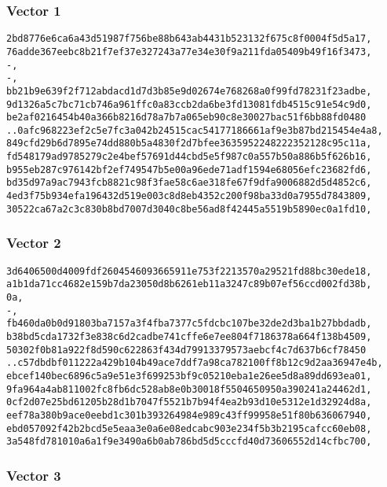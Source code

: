\documentclass[
]{article}
\begin{document}
\hypertarget{vector-1-1}{%
\subsubsection{Vector 1}\label{vector-1-1}}

\begin{verbatim}
2bd8776e6ca6a43d51987f756be88b643ab4431b523132f675c8f0004f5d5a17,
76adde367eebc8b21f7ef37e327243a77e34e30f9a211fda05409b49f16f3473,
-,
-,
bb21b9e639f2f712abdacd1d7d3b85e9d02674e768268a0f99fd78231f23adbe,
9d1326a5c7bc71cb746a961ffc0a83ccb2da6be3fd13081fdb4515c91e54c9d0,
be2af0216454b40a366b8216d78a7b7a065eb90c8e30027bac51f6bb88fd0480
..0afc968223ef2c5e7fc3a042b24515cac54177186661af9e3b87bd215454e4a8,
849cfd29b6d7895e74dd880b5a4830f2d7bfee3635952248222352128c95c11a,
fd548179ad9785279c2e4bef57691d44cbd5e5f987c0a557b50a886b5f626b16,
b955eb287c976142bf2ef749547b5e00a96ede71adf1594e68056efc23682fd6,
bd35d97a9ac7943fcb8821c98f3fae58c6ae318fe67f9dfa9006882d5d4852c6,
4ed3f75b934efa196432d519e003c8d8eb4352c200f98ba33d0a7955d7843809,
30522ca67a2c3c830b8bd7007d3040c8be56ad8f42445a5519b5890ec0a1fd10,
\end{verbatim}

\hypertarget{vector-2-1}{%
\subsubsection{Vector 2}\label{vector-2-1}}

\begin{verbatim}
3d6406500d4009fdf2604546093665911e753f2213570a29521fd88bc30ede18,
a1b1da71cc4682e159b7da23050d8b6261eb11a3247c89b07ef56ccd002fd38b,
0a,
-,
fb460da0b0d91803ba7157a3f4fba7377c5fdcbc107be32de2d3ba1b27bbdadb,
b38bd5cda1732f3e838c6d2cadbe741cffe6e7ee804f7186378a664f138b4509,
50302f0b81a922f8d590c622863f434d79913379573aebcf4c7d637b6cf78450
..c57dbdbf011222a429b104b49ace7ddf7a98ca782100ff8b12c9d2aa36947e4b,
ebcef140bec6896c5a9e51e3f699253bf9c05210eba1e26ee5d8a89dd693ea01,
9fa964a4ab811002fc8fb6dc528ab8e0b30018f5504650950a390241a24462d1,
0cf2d07e25bd61205b28d1b7047f5521b7b94f4ea2b93d10e5312e1d32924d8a,
eef78a380b9ace0eebd1c301b393264984e989c43ff99958e51f80b636067940,
ebd057092f42b2bcd5e5eaa3e0a6e08edcabc903e234f5b3b2195cafcc60eb08,
3a548fd781010a6a1f9e3490a6b0ab786bd5d5cccfd40d73606552d14cfbc700,
\end{verbatim}

\hypertarget{vector-3-1}{%
\subsubsection{Vector 3}\label{vector-3-1}}
\end{document}
